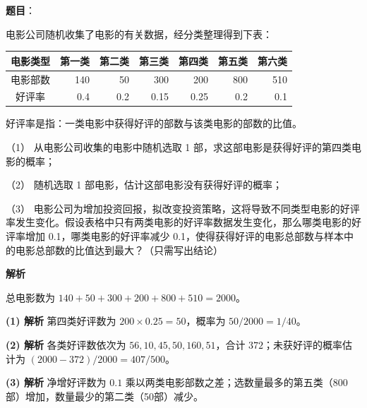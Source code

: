 \begin{answer}

\textbf{题目}：

电影公司随机收集了电影的有关数据，经分类整理得到下表：

\begin{center}
\begin{tabular}{crrrrrr}
\toprule
电影类型 & 第一类 & 第二类 & 第三类 & 第四类 & 第五类 & 第六类 \\
\midrule
电影部数 & 140 & 50 & 300 & 200 & 800 & 510 \\
好评率 & 0.4 & 0.2 & 0.15 & 0.25 & 0.2 & 0.1 \\
\bottomrule
\end{tabular}
\end{center}

好评率是指：一类电影中获得好评的部数与该类电影的部数的比值。

（1） 从电影公司收集的电影中随机选取 1 部，求这部电影是获得好评的第四类电影的概率；

（2） 随机选取 1 部电影，估计这部电影没有获得好评的概率；

（3） 电影公司为增加投资回报，拟改变投资策略，这将导致不同类型电影的好评率发生变化。假设表格中只有两类电影的好评率数据发生变化，那么哪类电影的好评率增加 0.1，哪类电影的好评率减少 0.1，使得获得好评的电影总部数与样本中的电影总部数的比值达到最大？（只需写出结论）

\textbf{解析}

总电影数为 $140+50+300+200+800+510=2000$。

\textbf{(1) 解析} 第四类好评数为 $200\times0.25=50$，概率为 $50/2000=1/40$。

\textbf{(2) 解析} 各类好评数依次为 $56,10,45,50,160,51$，合计 $372$；未获好评的概率估计为 $(2000-372)/2000=407/500$。

\textbf{(3) 解析} 净增好评数为 $0.1$ 乘以两类电影部数之差；选数量最多的第五类（800部）增加，数量最少的第二类（50部）减少。




\end{answer}
